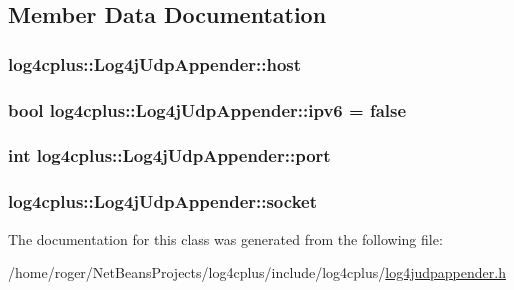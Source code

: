 \subsection{Member Data Documentation}
\hypertarget{classlog4cplus_1_1Log4jUdpAppender_a198aeab5fafab8814d17c489e9243722}{
\subsubsection[{host}]{ log4cplus\-::\-Log4j\-Udp\-Appender\-::host\hspace{0.3cm}{\ttfamily [protected]}}}\label{classlog4cplus_1_1Log4jUdpAppender_a198aeab5fafab8814d17c489e9243722}
\hypertarget{classlog4cplus_1_1Log4jUdpAppender_a71b6b31bcf31c3b7285c2cfc6248bfad}{
\subsubsection[{ipv6}]{\setlength{\rightskip}{0pt plus 5cm}bool log4cplus\-::\-Log4j\-Udp\-Appender\-::ipv6 = false\hspace{0.3cm}{\ttfamily [protected]}}}\label{classlog4cplus_1_1Log4jUdpAppender_a71b6b31bcf31c3b7285c2cfc6248bfad}
\hypertarget{classlog4cplus_1_1Log4jUdpAppender_aa096edcccceef2fcf8af241acf86fe8c}{
\subsubsection[{port}]{\setlength{\rightskip}{0pt plus 5cm}int log4cplus\-::\-Log4j\-Udp\-Appender\-::port\hspace{0.3cm}{\ttfamily [protected]}}}\label{classlog4cplus_1_1Log4jUdpAppender_aa096edcccceef2fcf8af241acf86fe8c}
\hypertarget{classlog4cplus_1_1Log4jUdpAppender_a8c7715d8dfd8e1e6bd2a5f4a355a521a}{
\subsubsection[{socket}]{ log4cplus\-::\-Log4j\-Udp\-Appender\-::socket\hspace{0.3cm}{\ttfamily [protected]}}}\label{classlog4cplus_1_1Log4jUdpAppender_a8c7715d8dfd8e1e6bd2a5f4a355a521a}


The documentation for this class was generated from the following file\-:\begin{DoxyCompactItemize}
\item 
/home/roger/\-Net\-Beans\-Projects/log4cplus/include/log4cplus/\hyperlink{log4judpappender_8h}{log4judpappender.\-h}\end{DoxyCompactItemize}
